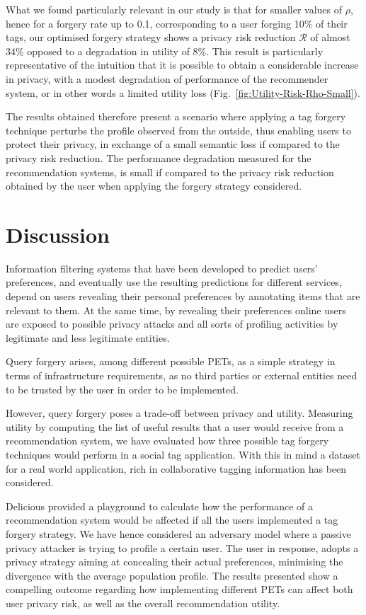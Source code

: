 What we found particularly relevant in our study is that for smaller values of $\rho$, hence for a forgery rate up to 0.1, corresponding to a user forging 10\% of their tags, our optimised forgery strategy shows a privacy risk reduction $\mathcal{R}$  of almost 34\% opposed to a degradation in utility of 8\%. This result is particularly representative of the intuition that it is possible to obtain a considerable increase in privacy, with a modest degradation of performance of the recommender system, or in other words a limited utility loss (Fig.~\ref{fig:Utility-Risk-Rho-Small}).

The results obtained therefore present a scenario where applying a tag forgery technique perturbs the profile observed from the outside, thus enabling users to protect their privacy, in exchange of a small semantic loss if compared to the privacy risk reduction. The performance degradation measured for the recommendation systems, is small if compared to the privacy risk reduction obtained by the user when applying the forgery strategy considered.

\section{Discussion}
\label{sec:discussion}
\noindent
Information filtering systems that have been developed to predict users' preferences, and eventually use the resulting predictions for different services, depend on users revealing their personal preferences by annotating items that are relevant to them.  At the same time, by revealing their preferences online users are exposed to possible privacy attacks and all sorts of profiling activities by legitimate and less legitimate entities.

Query forgery arises, among different possible PETs, as a simple strategy in terms of infrastructure requirements, as no third parties or external entities need to be trusted by the user in order to be implemented.

However, query forgery poses a trade-off between privacy and utility. Measuring utility by computing the list of useful results that a user would receive from a recommendation system, we have evaluated how three possible tag forgery techniques would perform in a social tag application. With this in mind a dataset for a real world application, rich in collaborative tagging information has been considered.

Delicious provided a playground to calculate how the performance of a recommendation system would be affected if all the users implemented a tag forgery strategy. We have hence considered an adversary model where a passive privacy attacker is trying to profile a certain user. The user in response, adopts a privacy strategy aiming at concealing their actual preferences, minimising the divergence with the average population profile. The results presented show a compelling outcome regarding  how implementing different PETs can affect both user privacy risk, as well as the overall recommendation utility.

